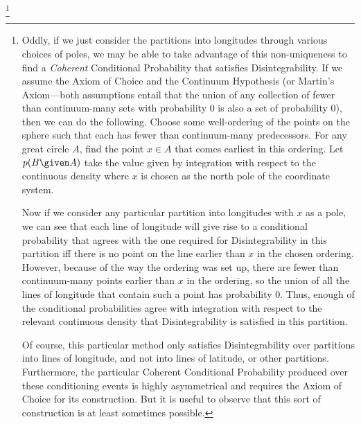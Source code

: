 \footnote{\label{acch}Oddly, if we just consider the partitions into longitudes through various choices of poles, we may be able to take advantage of this non-uniqueness to find a \emph{Coherent} Conditional Probability that satisfies Disintegrability. If we assume the Axiom of Choice and the Continuum Hypothesis (or Martin's Axiom---both assumptions entail that the union of any collection of fewer than continuum-many sets with  probability $0$ is also a set of  probability $0$), then we can do the following. Choose some well-ordering of the points on the sphere such that each has fewer than continuum-many predecessors. For any great circle $A$, find the point $x\in A$ that comes earliest in this ordering. Let $p(B \given A)$ take the value given by integration with respect to the continuous density where $x$ is chosen as the north pole of the coordinate system.

Now if we consider any particular partition into longitudes with $x$ as a pole, we can see that each line of longitude will give rise to a conditional probability that agrees with the one required for Disintegrability in this partition iff there is no point on the line earlier than $x$ in the chosen ordering. However, because of the way the ordering was set up, there are fewer than continuum-many points earlier than $x$ in the ordering, so the union of all the lines of longitude that contain such a point has  probability $0$. Thus, enough of the conditional probabilities agree with integration with respect to the relevant continuous density that Disintegrability is satisfied in this partition.

Of course, this particular method only satisfies Disintegrability over partitions into lines of longitude, and not into lines of latitude, or other partitions. Furthermore, the particular Coherent Conditional Probability produced over these conditioning events is highly asymmetrical and requires the Axiom of Choice for its construction. But it is useful to observe that this sort of construction is at least sometimes possible.}

